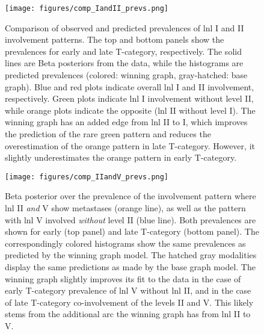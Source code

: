 \documentclass[twocolumn]{aastex631}
\begin{document}
\begin{figure*}
    \begin{centering}
        \texttt{[image: figures/comp\_IandII\_prevs.png]}
        \caption{Comparison of observed and predicted prevalences of \gls{lnl} I and II involvement patterns. The top and bottom panels show the prevalences for early and late T-category, respectively. The solid lines are Beta posteriors from the data, while the histograms are predicted prevalences (colored: winning graph, gray-hatched: base graph). Blue and red plots indicate overall \gls{lnl} I and II involvement, respectively. Green plots indicate \gls{lnl} I involvement without level II, while orange plots indicate the opposite (\gls{lnl} II without level I). The winning graph has an added edge from \gls{lnl} II to I, which improves the prediction of the rare green pattern and reduces the overestimation of the orange pattern in late T-category. However, it slightly underestimates the orange pattern in early T-category.}
        \label{fig:IandII_prevs}
    \end{centering}
\end{figure*}


\begin{figure}
    \begin{centering}
        \texttt{[image: figures/comp\_IIandV\_prevs.png]}
        \caption{Beta posterior over the prevalence of the involvement pattern where \gls{lnl} II \emph{and} V show metastases (orange line), as well as the pattern with \gls{lnl} V involved \emph{without} level II (blue line). Both prevalences are shown for early (top panel) and late T-category (bottom panel). The correspondingly colored histograms show the same prevalences as predicted by the winning graph model. The hatched gray modalities display the same predictions as made by the base graph model. The winning graph slightly improves its fit to the data in the case of early T-category prevalence of \gls{lnl} V without \gls{lnl} II, and in the case of late T-category co-involvement of the levels II and V. This likely stems from the additional arc the winning graph has from \gls{lnl} II to V.}
        \label{fig:IIandV_prevs}
    \end{centering}
\end{figure}
\end{document}
